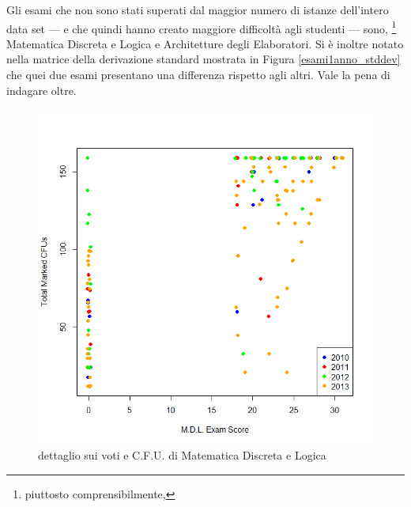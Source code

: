                 Gli esami che non sono stati superati dal maggior numero di istanze dell’intero data set --- e che quindi hanno creato maggiore difficoltà agli studenti --- sono, \footnote{piuttosto comprensibilmente,} Matematica Discreta e Logica e Architetture degli Elaboratori. Si è inoltre notato nella matrice della derivazione standard mostrata in Figura \ref{esami1anno_stddev} che quei due esami presentano una differenza rispetto agli altri. Vale la pena di indagare oltre.

                \begin{figure}
                    \centering
                    \caption{dettaglio sui voti e C.F.U. di Matematica Discreta e Logica}
                    \label{mdl}
                	\includegraphics[scale=0.5]{img/scatter_plot_5.png}
                \end{figure}

